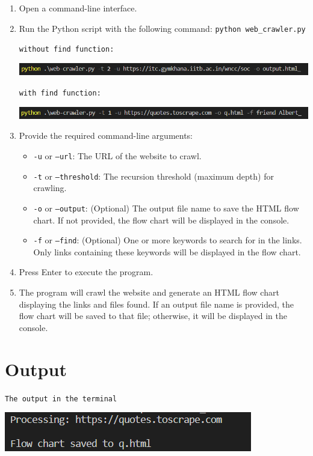 \documentclass{article}
\begin{document}
\begin{enumerate}
    \item Open a command-line interface.
    \item Run the Python script with the following command: \texttt{python web\_crawler.py}
    \vspace{\baselineskip}


    \texttt{without find function: }
    
    \includegraphics[width=0.9\linewidth]{sc1.png}

    
    \texttt{with find function: }

    \includegraphics[width=0.9\linewidth]{sc2.png}
    \item Provide the required command-line arguments:
    \begin{itemize}
        \item \texttt{-u} or \texttt{--url}: The URL of the website to crawl.
        \item \texttt{-t} or \texttt{--threshold}: The recursion threshold (maximum depth) for crawling.
        \item \texttt{-o} or \texttt{--output}: (Optional) The output file name to save the HTML flow chart. If not provided, the flow chart will be displayed in the console.
        \item \texttt{-f} or \texttt{--find}: (Optional) One or more keywords to search for in the links. Only links containing these keywords will be displayed in the flow chart.
    \end{itemize}
    \item Press Enter to execute the program.
    \item The program will crawl the website and generate an HTML flow chart displaying the links and files found. If an output file name is provided, the flow chart will be saved to that file; otherwise, it will be displayed in the console.
\end{enumerate}

\section{Output}
\texttt{The output in the terminal}

\vspace{0.2cm}
\includegraphics[scale=0.7]{sc3.png}
\end{document}
